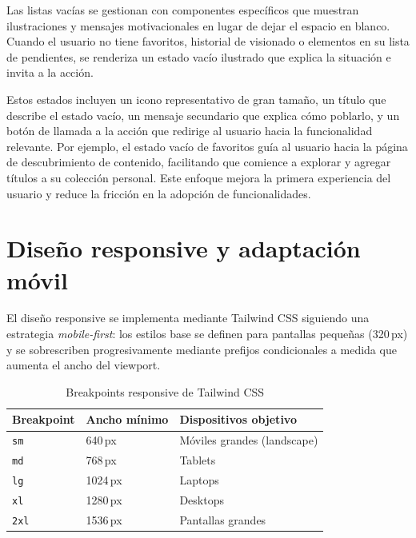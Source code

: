 Las listas vacías se gestionan con componentes específicos que muestran ilustraciones y mensajes motivacionales en lugar de dejar el espacio en blanco. Cuando el usuario no tiene favoritos, historial de visionado o elementos en su lista de pendientes, se renderiza un estado vacío ilustrado que explica la situación e invita a la acción.

Estos estados incluyen un icono representativo de gran tamaño, un título que describe el estado vacío, un mensaje secundario que explica cómo poblarlo, y un botón de llamada a la acción que redirige al usuario hacia la funcionalidad relevante. Por ejemplo, el estado vacío de favoritos guía al usuario hacia la página de descubrimiento de contenido, facilitando que comience a explorar y agregar títulos a su colección personal. Este enfoque mejora la primera experiencia del usuario y reduce la fricción en la adopción de funcionalidades.

\section{Diseño responsive y adaptación móvil}

El diseño responsive se implementa mediante Tailwind CSS siguiendo una estrategia \textit{mobile-first}: los estilos base se definen para pantallas pequeñas (320\,px) y se sobrescriben progresivamente mediante prefijos condicionales a medida que aumenta el ancho del viewport.

\begin{table}[!htbp]
\begin{center}
\begin{tabular}{| l | l | l |}
\hline
\textbf{Breakpoint} & \textbf{Ancho mínimo} & \textbf{Dispositivos objetivo} \\
\hline
\hline
\texttt{sm} & 640\,px & Móviles grandes (landscape) \\
\hline
\texttt{md} & 768\,px & Tablets \\
\hline
\texttt{lg} & 1024\,px & Laptops \\
\hline
\texttt{xl} & 1280\,px & Desktops \\
\hline
\texttt{2xl} & 1536\,px & Pantallas grandes \\
\hline
\end{tabular}
\caption{Breakpoints responsive de Tailwind CSS}
\label{tab:breakpoints}
\end{center}
\end{table}

